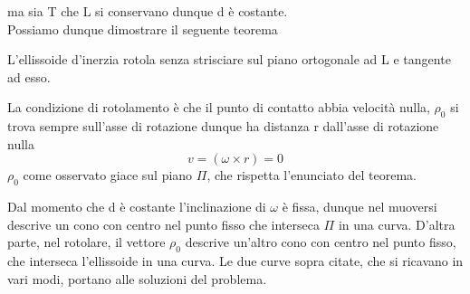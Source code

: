 \documentclass[
10pt, %
a4paper, %
oneside, %
headinclude,footinclude, %
BCOR5mm, %
]{scrartcl}
\begin{document}
ma sia T che L si conservano dunque d è costante.\\
Possiamo dunque dimostrare il seguente teorema
\begin{teorema}[Poinsot]
	L'ellissoide d'inerzia rotola senza strisciare sul piano ortogonale ad L e tangente ad esso.
\end{teorema}
\begin{dimostrazione}
	La condizione di rotolamento è che il punto di contatto abbia velocità nulla, $\rho_0$ si trova sempre sull'asse di rotazione dunque ha distanza r dall'asse di rotazione nulla
	\[v = (\omega\times r) = 0\]
	$\rho_0$ come osservato giace sul piano $\Pi$, che rispetta l'enunciato del teorema. 
\end{dimostrazione}
Dal momento che d è costante l'inclinazione di $\omega$ è fissa, dunque nel muoversi descrive un cono con centro nel punto fisso che interseca $\Pi$ in una curva. D'altra parte, nel rotolare, il vettore $\rho_0$ descrive un'altro cono con centro nel punto fisso, che interseca l'ellissoide in una curva. Le due curve sopra citate, che si ricavano in vari modi, portano alle soluzioni del problema.   
\end{document}
